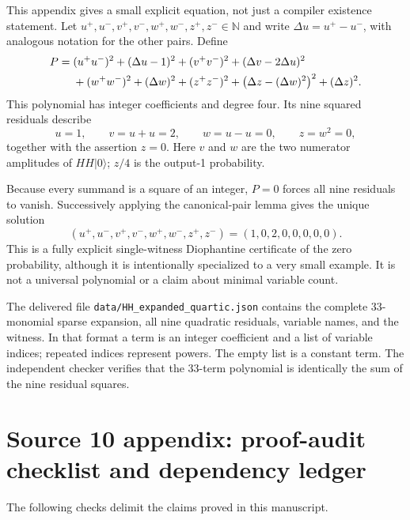 \documentclass[11pt,letterpaper]{article}
\numberwithin{equation}{section}
\theoremstyle{definition}
\theoremstyle{remark}
\newcommand{\N}{\mathbb N}
\newcommand{\ket}[1]{\lvert #1\rangle}
\begin{document}
This appendix gives a small explicit equation, not just a compiler existence
statement. Let $u^+,u^-,v^+,v^-,\allowbreak w^+,w^-,z^+,z^-\in\N$ and write
$\Delta u=u^+-u^-$, with analogous notation for the other pairs. Define
\begin{align}
 P={}&(u^+u^-)^2+(\Delta u-1)^2
       +(v^+v^-)^2+(\Delta v-2\Delta u)^2\notag\\
    &+(w^+w^-)^2+(\Delta w)^2
       +(z^+z^-)^2+
          \bigl(\Delta z-(\Delta w)^2\bigr)^2+(\Delta z)^2.
\label{pqc:cc:eq:explicitquartic}
\end{align}
This polynomial has integer coefficients and degree four. Its nine squared
residuals describe
\[
 u=1,\qquad v=u+u=2,\qquad w=u-u=0,\qquad z=w^2=0,
\]
together with the assertion $z=0$. Here $v$ and $w$ are the two numerator
amplitudes of $HH\ket0$; $z/4$ is the output-1 probability.

Because every summand is a square of an integer, $P=0$ forces all nine
residuals to vanish. Successively applying the canonical-pair lemma gives the
unique solution
\begin{equation}
 (u^+,u^-,v^+,v^-,w^+,w^-,z^+,z^-)
   =(1,0,2,0,0,0,0,0).
\end{equation}
This is a fully explicit single-witness Diophantine certificate of the zero
probability, although it is intentionally specialized to a very small example.
It is not a universal polynomial or a claim about minimal variable count.

The delivered file \texttt{data/HH\_expanded\_quartic.json} contains the complete
33-monomial sparse expansion, all nine quadratic residuals, variable names,
and the witness. In that format a term is an integer coefficient and a list
of variable indices; repeated indices represent powers. The empty list is a
constant term. The independent checker verifies that the 33-term polynomial
is identically the sum of the nine residual squares.

\section{Source 10 appendix: proof-audit checklist and dependency ledger}
\label{pqc:cc:app:audit}

The following checks delimit the claims proved in this manuscript.
\end{document}
